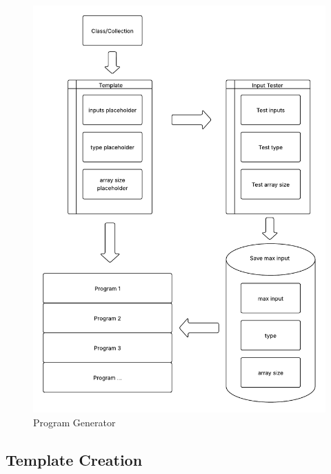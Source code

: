 \begin{figure}[htbp]%
    \centering
    \includegraphics[width = 1 \textwidth]{figures/program_generator.pdf}
    \caption{Program Generator}
    \label{fig:program_generator}
\end{figure}


\subsection{Template Creation} \label{sec:work_stage1_template_creation}



